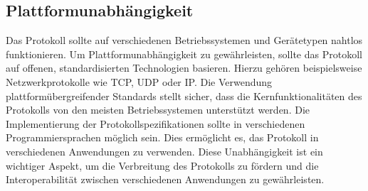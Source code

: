 \subsection{Plattformunabhängigkeit}

Das Protokoll sollte auf verschiedenen Betriebssystemen und Gerätetypen nahtlos funktionieren. Um Plattformunabhängigkeit zu gewährleisten, sollte das Protokoll auf offenen, standardisierten Technologien basieren. Hierzu gehören beispielsweise Netzwerkprotokolle wie TCP, UDP oder IP. Die Verwendung plattformübergreifender Standards stellt sicher, dass die Kernfunktionalitäten des Protokolls von den meisten Betriebssystemen unterstützt werden. Die Implementierung der Protokollspezifikationen sollte in verschiedenen Programmiersprachen möglich sein. Dies ermöglicht es, das Protokoll in verschiedenen Anwendungen zu verwenden. Diese Unabhängigkeit ist ein wichtiger Aspekt, um die Verbreitung des Protokolls zu fördern und die Interoperabilität zwischen verschiedenen Anwendungen zu gewährleisten.
